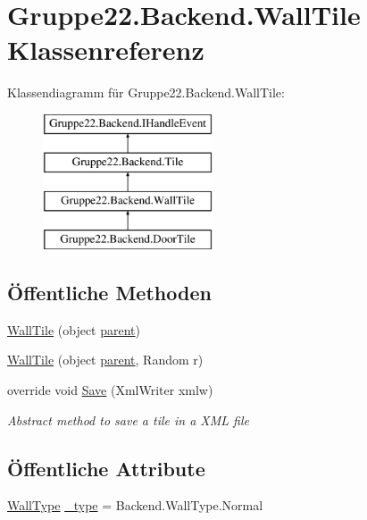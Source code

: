 \hypertarget{class_gruppe22_1_1_backend_1_1_wall_tile}{\section{Gruppe22.\-Backend.\-Wall\-Tile Klassenreferenz}
\label{class_gruppe22_1_1_backend_1_1_wall_tile}
}
Klassendiagramm für Gruppe22.\-Backend.\-Wall\-Tile\-:\begin{figure}[H]
\begin{center}
\leavevmode
\includegraphics[height=4.000000cm]{class_gruppe22_1_1_backend_1_1_wall_tile}
\end{center}
\end{figure}
\subsection*{Öffentliche Methoden}
\begin{DoxyCompactItemize}
\item 
\hyperlink{class_gruppe22_1_1_backend_1_1_wall_tile_acce292c112ba70950780a857f1808389}{Wall\-Tile} (object \hyperlink{class_gruppe22_1_1_backend_1_1_tile_abc12933c70eb3a2ebbb2fde9f45c2632}{parent})
\item 
\hyperlink{class_gruppe22_1_1_backend_1_1_wall_tile_a23a3c1f82495de319ecd814f7aabcf0d}{Wall\-Tile} (object \hyperlink{class_gruppe22_1_1_backend_1_1_tile_abc12933c70eb3a2ebbb2fde9f45c2632}{parent}, Random r)
\item 
override void \hyperlink{class_gruppe22_1_1_backend_1_1_wall_tile_affcf30d6a5d46d74c8c570bb83cf99f8}{Save} (Xml\-Writer xmlw)
\begin{DoxyCompactList}\small\item\em Abstract method to save a tile in a X\-M\-L file \end{DoxyCompactList}\end{DoxyCompactItemize}
\subsection*{Öffentliche Attribute}
\begin{DoxyCompactItemize}
\item 
\hyperlink{namespace_gruppe22_1_1_backend_ab19de7e2856537f39fbd380beea6ddba}{Wall\-Type} \hyperlink{class_gruppe22_1_1_backend_1_1_wall_tile_a97e9f6703a21be72980e541b16d2a98b}{\-\_\-type} = Backend.\-Wall\-Type.\-Normal
\end{DoxyCompactItemize}
